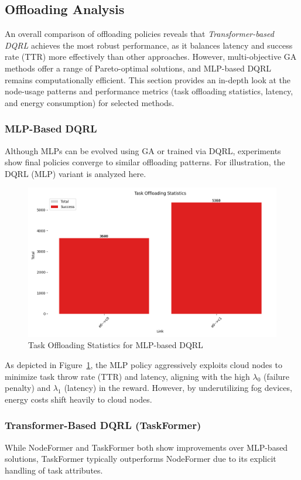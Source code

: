 \subsection{Offloading Analysis}
\label{subsec:offloading-analysis}



An overall comparison of offloading policies reveals that \emph{Transformer-based DQRL} achieves the most robust performance, as it balances latency and success rate (TTR) more effectively than other approaches. However, multi-objective GA methods offer a range of Pareto-optimal solutions, and MLP-based DQRL remains computationally efficient. This section provides an in-depth look at the node-usage patterns and performance metrics (task offloading statistics, latency, and energy consumption) for selected methods.


\subsubsection{MLP-Based DQRL}
Although MLPs can be evolved using GA or trained via DQRL, experiments show final policies converge to similar offloading patterns. For illustration, the DQRL (MLP) variant is analyzed here.

\begin{figure}[H]
    \centering
    \includegraphics[width=0.5\linewidth]{figs/mlp_task_offloading_statistics.png}
    \caption{Task Offloading Statistics for MLP-based DQRL}
    \label{fig:mlp-task-offloading-stats}
\end{figure}

As depicted in Figure~\ref{fig:mlp-task-offloading-stats}, the MLP policy aggressively exploits cloud nodes to minimize task throw rate (TTR) and latency, aligning with the high \(\lambda_0\) (failure penalty) and \(\lambda_1\) (latency) in the reward. However, by underutilizing fog devices, energy costs shift heavily to cloud nodes.



\subsubsection{Transformer-Based DQRL (TaskFormer)}
While NodeFormer and TaskFormer both show improvements over MLP-based solutions, TaskFormer typically outperforms NodeFormer due to its explicit handling of task attributes.

